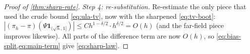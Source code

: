 \documentclass[aap,preprint]{imsart}
\numberwithin{equation}{section}
\theoremstyle{plain}
\theoremstyle{definition}
\begin{document}
\begin{proof}[Proof of \cref{thm:sharp-rate}]
  \emph{Step 4: re-substitution.}  Re-estimate the only piece that used the crude bound \cref{eq:ula-tv}, now with the sharpened \cref{eq:tv-boot}:
  $|(\pi_h-\pi)(\Psi\mathbf 1_{(\sqrt h,1]})|\le Ch^{1-\delta/2}\cdot h^{\delta/2}=O(h)$ (and the far-field piece improves likewise).  All parts of the difference term are now $O(h)$, so \cref{eq:bias-split,eq:main-term} give \cref{eq:sharp-law}.
\end{proof}


\end{document}
